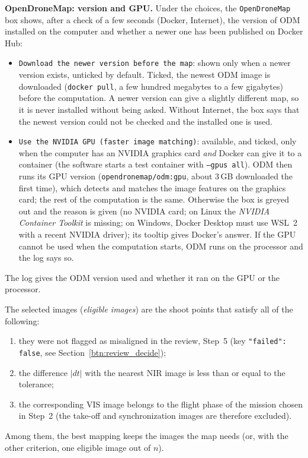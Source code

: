 \documentclass[a4paper,11pt]{report}
\begin{document}
\textbf{OpenDroneMap: version and GPU.} Under the choices, the \texttt{OpenDroneMap} box shows, after a check of a few seconds (Docker, Internet), the version of ODM installed on the computer and whether a newer one has been published on Docker Hub:
\begin{itemize}
	\item \texttt{Download the newer version before the map}: shown only when a newer version exists, unticked by default. Ticked, the newest ODM image is downloaded (\texttt{docker pull}, a few hundred megabytes to a few gigabytes) before the computation. A newer version can give a slightly different map, so it is never installed without being asked. Without Internet, the box says that the newest version could not be checked and the installed one is used.
	\item \texttt{Use the NVIDIA GPU (faster image matching)}: available, and ticked, only when the computer has an NVIDIA graphics card \emph{and} Docker can give it to a container (the software starts a test container with \texttt{--gpus all}). ODM then runs its GPU version (\texttt{opendronemap/odm:gpu}, about 3\,GB downloaded the first time), which detects and matches the image features on the graphics card; the rest of the computation is the same. Otherwise the box is greyed out and the reason is given (no NVIDIA card; on Linux the \emph{NVIDIA Container Toolkit} is missing; on Windows, Docker Desktop must use WSL~2 with a recent NVIDIA driver); its tooltip gives Docker's answer. If the GPU cannot be used when the computation starts, ODM runs on the processor and the log says so.
\end{itemize}
The log gives the ODM version used and whether it ran on the GPU or the processor.


The selected images (\emph{eligible images}) are the shoot points that satisfy all of the following:
\begin{enumerate}
	\item they were not flagged as misaligned in the review, Step~5 (key \texttt{"failed": false}, see Section~\ref{btn:review_decide});
	\item the difference $|dt|$ with the nearest NIR image is less than or equal to the tolerance;
	\item the corresponding VIS image belongs to the flight phase of the mission chosen in Step~2 (the take-off and synchronization images are therefore excluded).
\end{enumerate}
Among them, the best mapping keeps the images the map needs (or, with the other criterion, one eligible image out of $n$).
\end{document}
